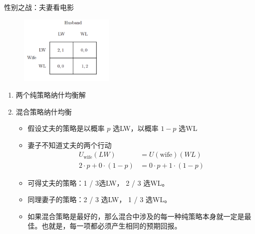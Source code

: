 \begin{remark}
    性别之战：夫妻看电影
    \begin{figure}[htbp]
        \centering
        \includegraphics[width=0.4\textwidth]{./figure/fig7.png}
    \end{figure}
    \begin{enumerate}
        \item 两个纯策略纳什均衡解
        \item 混合策略纳什均衡\begin{itemize}
            \item 假设丈夫的策略是以概率 $p$ 选LW，以概率 $1-p$ 选WL
            \item 妻子不知道丈夫的两个行动\begin{align*}
                U_{\text{wife}}(LW) &= U(\text{wife})(WL)\\
                2\cdot p + 0 \cdot (1 - p) &= 0 \cdot p + 1 \cdot (1 - p)
            \end{align*}
            \item 可得丈夫的策略：1 / 3选LW， 2 / 3 选WL。
            \item 同理妻子的策略：2 / 3 选LW， 1 / 3 选WL。
            \item 如果混合策略是最好的，那么混合中涉及的每一种纯策略本身就一定是最佳。也就是，每一项都必须产生相同的预期回报。
        \end{itemize}
    \end{enumerate}
\end{remark}

